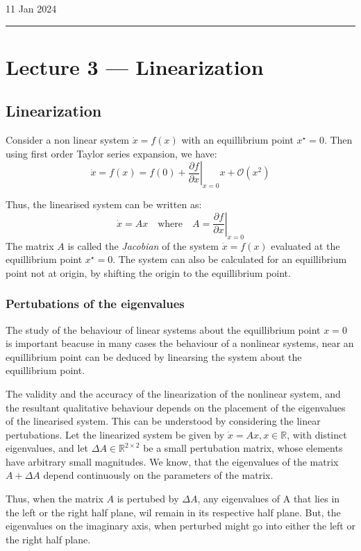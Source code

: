 \hfill\small{11 Jan 2024}
\vspace{0.5em}
\hrule
\vspace{-0.5em}
\section{Lecture 3 --- Linearization}
\subsection{Linearization}

Consider a non linear system \(\dot{x} = f(x)\) with an equillibrium point \(x^{\star} = 0\).
Then using first order Taylor series expansion, we have:
\[
    \dot{x} = f(x) = f(0) + \left . \frac{\partial f}{\partial x} \right |_{x=0} x + \mathcal{O}(x^2)
\]

Thus, the linearised system can be written as:
\[
    \dot{x} = A x \quad \text{where} \quad A = \left . \frac{\partial f}{\partial x} \right |_{x=0}
\]
The matrix \(A\) is called the \emph{Jacobian} of the system \(\dot{x} = f(x)\) evaluated at the
equillibrium point \(x^{\star} = 0\). The system can also be calculated for an equillibrium point
not at origin, by shifting the origin to the equillibrium point.
    
\subsubsection{Pertubations of the eigenvalues}
The study of the behaviour of linear systems about the equillibrium point \(x=0\) is important
beacuse in many cases the behaviour of a nonlinear systems, near an equillibrium point can
be deduced by linearsing the system about the equillibrium point.

The validity and the accuracy of the linearization of the nonlinear system, and the resultant
qualitative behaviour depends on the placement of the eigenvalues of the linearised system.
This can be understood by considering the linear pertubations. Let the linearized system be
given by \(\dot{x} = Ax, x\in\mathbb{R} \), with distinct eigenvalues, and let
\(\Delta A \in \mathbb{R}^{2\times 2}\) be a small pertubation matrix, whose elements have arbitrary
small magnitudes. We know, that the eigenvalues of the matrix \(A + \Delta A\)
depend continuously on the parameters of the matrix. 

Thus, when the matrix \(A\) is pertubed by \(\Delta A\), any eigenvalues of A that lies in
the left or the right half plane, wil remain in its respective half plane. But, the eigenvalues
on the imaginary axis, when perturbed might go into either the left or the right half plane.

